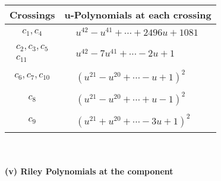 \documentclass[1p]{elsarticle_modified}
\theoremstyle{definition}
\begin{document}
\begin{tabular}{m{50pt}|m{274pt}}
Crossings & \hspace{64pt}u-Polynomials at each crossing \\
\hline $$\begin{aligned}c_{1},c_{4}\end{aligned}$$&$\begin{aligned}
&u^{42}- u^{41}+\cdots+2496 u+1081
\end{aligned}$\\
\hline $$\begin{aligned}c_{2},c_{3},c_{5}\\c_{11}\end{aligned}$$&$\begin{aligned}
&u^{42}-7 u^{41}+\cdots-2 u+1
\end{aligned}$\\
\hline $$\begin{aligned}c_{6},c_{7},c_{10}\end{aligned}$$&$\begin{aligned}
&(u^{21}- u^{20}+\cdots- u+1)^{2}
\end{aligned}$\\
\hline $$\begin{aligned}c_{8}\end{aligned}$$&$\begin{aligned}
&(u^{21}- u^{20}+\cdots+u-1)^{2}
\end{aligned}$\\
\hline $$\begin{aligned}c_{9}\end{aligned}$$&$\begin{aligned}
&(u^{21}+u^{20}+\cdots-3 u+1)^{2}
\end{aligned}$\\
\hline
\end{tabular}\\~\\
\newpage\renewcommand{\arraystretch}{1}
\flushleft \textbf{(v) Riley Polynomials at the component}\newline \\
\end{document}
